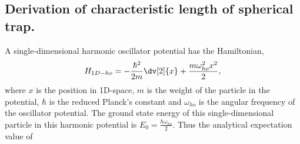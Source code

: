 \subsection{Derivation of characteristic length of spherical trap.}
A single-dimensional harmonic oscillator potential has the Hamiltonian,
\begin{equation*}
    H_{1D-ho} = -\frac{\hbar^2}{2m}\dv[2]{x} + \frac{m\omega^2_{ho}x^2}{2}, 
\end{equation*}
where $x$ is the position in 1D-space, $m$ is the weight of the particle in the potential, $\hbar$ is the reduced Planck's constant and $\omega_{ho}$ is the angular frequency of the oscillator potential. The ground state energy of this single-dimensional particle in this harmonic potential is $E_0=\frac{\hbar\omega_{ho}}{2}$. Thus the analytical expectation value of 



